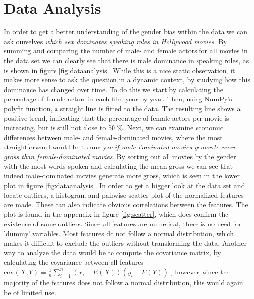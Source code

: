 \documentclass{article}
\begin{document}
\section{Data Analysis}
In order to get a better understanding of the gender bias within the data we can ask ourselves \emph{which sex dominates speaking roles in Hollywood movies}.
By summing and comparing the number of male- and female actors for all movies in the data set we can clearly see that there is male dominance in speaking roles, as is shown in figure \ref{fig:dataanalysis}. While this is a nice static observation, it makes more sense to ask the question in a dynamic context, by studying how this dominance has changed over time.
To do this we start by calculating the percentage of female actors in each film year by year. Then, using NumPy's polyfit function, a straight line is fitted to the data. The resulting line shows a  positive trend, indicating that the percentage of female actors per movie is increasing, but is still not close to 50 \%. Next, we can examine economic differences between male- and female-dominated movies, where the most straightforward would be to analyze \emph{if male-dominated movies generate more gross than female-dominated movies.}
By sorting out all movies by the gender with the most words spoken and calculating the mean gross we can see that indeed male-dominated movies generate more gross, which is seen in the lower plot in figure \ref{fig:dataanalysis}. 
In order to get a bigger look at the data set and locate outliers, a histogram and pairwise scatter plot of the normalized features are made. These can also indicate obvious correlations between the features. The plot is found in the appendix in figure \ref{fig:scatter}, which does confirm the existence of some outliers. Since all features are numerical, there is no need for 'dummy' variables. Most features do not follow a normal distribution, which makes it difficult to exclude the outliers without transforming the data. Another way to analyze the data would be to compute the covariance matrix, by calculating the covariance between all features $\text{cov}(X,Y) = \frac{1} {n} \sum_{i=1}^{n} (x_i-E(X))(y_i-E(Y))$ \cite{smlbook}, however, since the majority of the features does not follow a normal distribution, this would again be of limited use.
\end{document}
